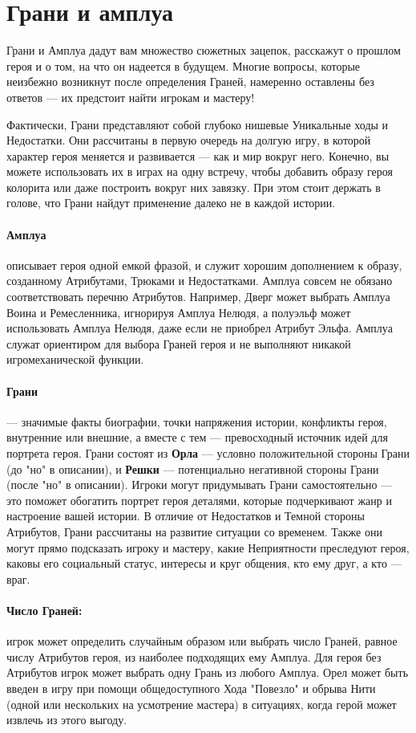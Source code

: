 \section{Грани и амплуа}
Грани и Амплуа дадут вам множество сюжетных зацепок, расскажут о прошлом героя и о том, на что он надеется в будущем. Многие вопросы, которые неизбежно возникнут после определения Граней, намеренно оставлены без ответов — их предстоит найти игрокам и мастеру!
\begin{tcolorbox}
Фактически, Грани представляют собой глубоко нишевые Уникальные ходы и Недостатки. Они рассчитаны в первую очередь на долгую игру, в которой характер героя меняется и развивается — как и мир вокруг него. Конечно, вы можете использовать их в играх на одну встречу, чтобы добавить образу героя колорита или даже построить вокруг них завязку. При этом стоит держать в голове, что Грани найдут применение далеко не в каждой истории.
\end{tcolorbox}
\paragraph{Амплуа} описывает героя одной емкой фразой, и служит хорошим дополнением к образу, созданному Атрибутами, Трюками и Недостатками. Амплуа совсем не обязано соответствовать перечню Атрибутов. Например, Дверг может выбрать Амплуа Воина и Ремесленника, игнорируя Амплуа Нелюдя, а полуэльф может использовать Амплуа Нелюдя, даже если не приобрел Атрибут Эльфа. Амплуа служат ориентиром для выбора Граней героя и не выполняют никакой игромеханической функции.
\paragraph{Грани} — значимые факты биографии, точки напряжения истории, конфликты героя, внутренние или внешние, а вместе с тем — превосходный источник идей для портрета героя. Грани состоят из \textbf{Орла} — условно положительной стороны Грани (до "но" в описании), и \textbf{Решки} — потенциально негативной стороны Грани (после "но" в описании). Игроки могут придумывать Грани самостоятельно — это поможет обогатить портрет героя деталями, которые подчеркивают жанр и настроение вашей истории.
В отличие от Недостатков и Темной стороны Атрибутов, Грани
рассчитаны на развитие ситуации со временем. Также они могут
прямо подсказать игроку и мастеру, какие Неприятности преследуют героя, каковы его социальный статус, интересы и круг общения, кто ему друг, а кто — враг.
\paragraph{Число Граней:} игрок может определить случайным образом или выбрать число Граней, равное числу Атрибутов героя, из наиболее подходящих ему Амплуа. Для героя без Атрибутов игрок может выбрать одну Грань из любого Амплуа. Орел может быть введен в игру при помощи общедоступного Хода
"Повезло" и обрыва Нити (одной или нескольких на усмотрение мастера) в ситуациях, когда герой может извлечь из этого выгоду.
